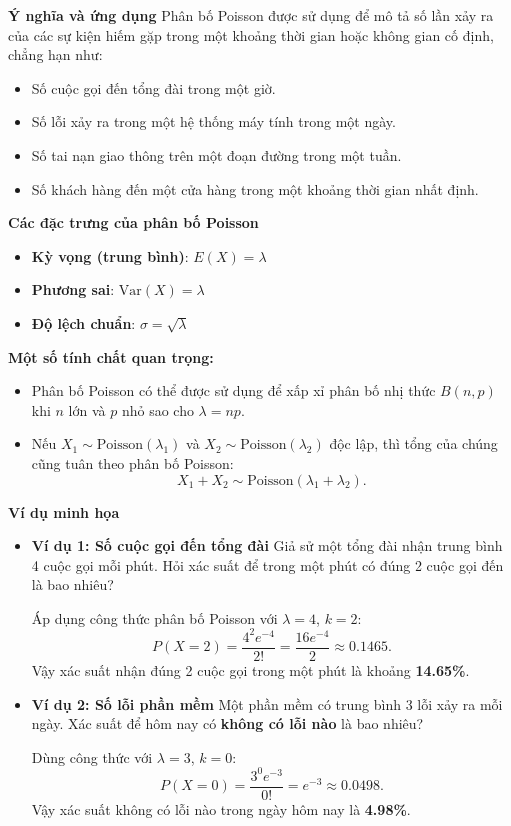 \textbf{Ý nghĩa và ứng dụng}
Phân bố Poisson được sử dụng để mô tả số lần xảy ra của các sự kiện hiếm gặp trong một khoảng thời gian hoặc không gian cố định, chẳng hạn như:
\begin{itemize}
    \item Số cuộc gọi đến tổng đài trong một giờ.
    \item Số lỗi xảy ra trong một hệ thống máy tính trong một ngày.
    \item Số tai nạn giao thông trên một đoạn đường trong một tuần.
    \item Số khách hàng đến một cửa hàng trong một khoảng thời gian nhất định.
\end{itemize}

\textbf{Các đặc trưng của phân bố Poisson}
\begin{itemize}
    \item \textbf{Kỳ vọng (trung bình)}: $E(X) = \lambda$
    \item \textbf{Phương sai}: $\text{Var}(X) = \lambda$
    \item \textbf{Độ lệch chuẩn}: $\sigma = \sqrt{\lambda}$
\end{itemize}

\textbf{Một số tính chất quan trọng:}
\begin{itemize}
    \item Phân bố Poisson có thể được sử dụng để xấp xỉ phân bố nhị thức $B(n, p)$ khi $n$ lớn và $p$ nhỏ sao cho $\lambda = np$.
    \item Nếu $X_1 \sim \text{Poisson}(\lambda_1)$ và $X_2 \sim \text{Poisson}(\lambda_2)$ độc lập, thì tổng của chúng cũng tuân theo phân bố Poisson:
    \begin{equation}
    X_1 + X_2 \sim \text{Poisson}(\lambda_1 + \lambda_2).
    \end{equation}
\end{itemize}

\textbf{Ví dụ minh họa}
\begin{itemize}
    \item \textbf{Ví dụ 1: Số cuộc gọi đến tổng đài}
    Giả sử một tổng đài nhận trung bình 4 cuộc gọi mỗi phút. Hỏi xác suất để trong một phút có đúng 2 cuộc gọi đến là bao nhiêu?

    Áp dụng công thức phân bố Poisson với $\lambda = 4$, $k = 2$:
    \begin{equation}
    P(X = 2) = \frac{4^2 e^{-4}}{2!} = \frac{16 e^{-4}}{2} \approx 0.1465.
    \end{equation}
    Vậy xác suất nhận đúng 2 cuộc gọi trong một phút là khoảng \textbf{14.65\%}.

    \item \textbf{Ví dụ 2: Số lỗi phần mềm}
    Một phần mềm có trung bình 3 lỗi xảy ra mỗi ngày. Xác suất để hôm nay có \textbf{không có lỗi nào} là bao nhiêu?

    Dùng công thức với $\lambda = 3$, $k = 0$:
    \begin{equation}
    P(X = 0) = \frac{3^0 e^{-3}}{0!} = e^{-3} \approx 0.0498.
    \end{equation}
    Vậy xác suất không có lỗi nào trong ngày hôm nay là \textbf{4.98\%}.
\end{itemize}


